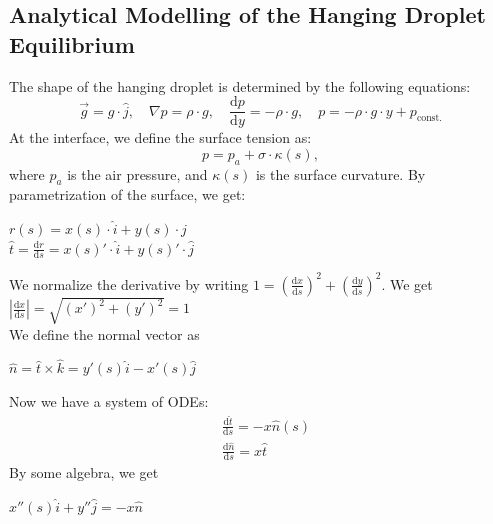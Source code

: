 \documentclass{jfm}
\begin{document}
\subsection{Analytical Modelling of the Hanging Droplet Equilibrium} \label{app:equi}
    The shape of the hanging droplet is determined by the following equations:\\
    \begin{equation}
        \vec{g}=g\cdot\hat{j}, \quad
        \nabla{p}=\rho\cdot{g}, \quad
        \frac{\mathrm{d}p}{\mathrm{d}y}=-\rho\cdot{g}, \quad
        p=-\rho\cdot{g}\cdot{y}+p_{\text{const.}}
    \end{equation}
    At the interface, we define the surface tension as:\\
    \begin{equation}
        p=p_{a}+\sigma \cdot \kappa(s),
        \label{eq:pressure}
    \end{equation}
    where $p_{a}$ is the air pressure, and $\kappa(s)$ is the surface curvature. By parametrization of the surface, we get:\\
    \begin{center}
        $r(s)=x(s)\cdot\hat{i}+y(s)\cdot\hat{j}$\\
        $\hat{t}=\frac{\mathrm{d}r}{\mathrm{d}s}=x(s)'\cdot\hat{i}+y(s)'\cdot\hat{j}$
    \end{center}
    We normalize the derivative by writing $1=\left(\frac{\mathrm{d}x}{\mathrm{d}s}\right)^2+\left(\frac{\mathrm{d}y}{\mathrm{d}s}\right)^2$. We get $\left|\frac{\mathrm{d}x}{\mathrm{d}s}\right|=\sqrt{(x')^2+(y')^2}=1$\\
    We define the normal vector as\\
    \begin{center}
        $\hat{n}=\hat{t}\times\hat{k}=y'(s)\hat{i}-x'(s)\hat{j}$
    \end{center}
    Now we have a system of ODEs:\\
    \begin{equation}
    \begin{aligned}
        &\frac{\mathrm{d}\hat{t}}{\mathrm{d}s}=-x\hat{n}(s)\\
        &\frac{\mathrm{d}\hat{n}}{\mathrm{d}s}=x\hat{t}
    \end{aligned}
    \end{equation}
    By some algebra, we get\\
    \begin{center}
        $x''(s)\hat{i}+y''\hat{j}=-x\hat{n}$
    \end{center}
\end{document}
